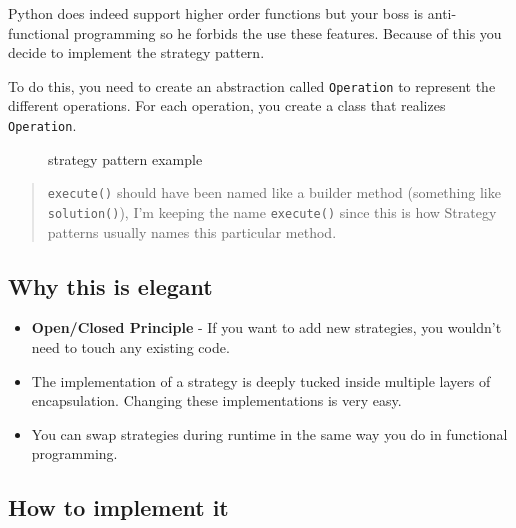 Python does indeed support higher order functions but your boss is
anti-functional programming so he forbids the use these features.
Because of this you decide to implement the strategy pattern.

To do this, you need to create an abstraction called \texttt{Operation}
to represent the different operations. For each operation, you create a
class that realizes \texttt{Operation}.

\begin{figure}
\centering
{}
\caption{strategy pattern example}
\end{figure}

\begin{quote}
\texttt{execute()} should have been named like a builder method
(something like \texttt{solution()}), I'm keeping the name
\texttt{execute()} since this is how Strategy patterns usually names
this particular method.
\end{quote}

\subsection{Why this is
elegant}\label{behavioral-patterns.md__why-this-is-elegant}

\begin{itemize}
\tightlist
\item
  \textbf{Open/Closed Principle} - If you want to add new strategies,
  you wouldn't need to touch any existing code.
\item
  The implementation of a strategy is deeply tucked inside multiple
  layers of encapsulation. Changing these implementations is very easy.
\item
  You can swap strategies during runtime in the same way you do in
  functional programming.
\end{itemize}

\subsection{How to implement
it}\label{behavioral-patterns.md__how-to-implement-it}

